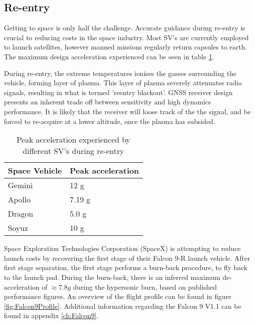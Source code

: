 \subsection{Re-entry}
Getting to space is only half the challenge. Accurate guidance during re-entry is crucial to reducing costs in the space industry. Most \ac{SV}'s are currently employed to launch satellites, however manned missions regularly return capsules to earth. The maximum design acceleration experienced can be seen in table \ref{ReEntryTable}. 

During re-entry, the extreme temperatures ionises the gasses surrounding the vehicle, forming  layer of plasma. This layer of plasma severely attenuates radio signals, resulting in what is termed 'reentry blackout'. GNSS receiver design presents an inherent trade off between sensitivity and high dynamics performance. It is likely that the receiver will loose track of the the signal, and be forced to re-acquire at a lower altitude, once the plasma has subsided. 


\begin{table}[!htb]
\centering
\begin{tabular}{|l|l|}
\hline
\rowcolor[HTML]{C0C0C0} 
Space Vehicle & Peak acceleration                    \\ \hline
Gemini        & 12 g \cite{FAA}                      \\ \hline
\rowcolor[HTML]{EFEFEF} 
Apollo        & 7.19 g \cite{johnston1975biomedical} \\ \hline
Dragon        & 5.0 g \cite{trevino2008spacex}       \\ \hline
\rowcolor[HTML]{EFEFEF} 
Soyuz         & 10 g \cite{ReentryDynamics}          \\ \hline
\end{tabular}
\caption{Peak acceleration experienced by different \ac{SV}'s during re-entry}
\label{ReEntryTable}
\end{table}

Space Exploration Technologies Corporation (SpaceX) is attempting to reduce launch costs by recovering the first stage of their Falcon 9-R launch vehicle. After first stage separation, the first stage performs a burn-back procedure, to fly back to the launch pad. During the burn-back, there is an inferred maximum de-acceleration of $\approx 7.8 g$ during the hypersonic burn, based on published performance figures. An overview of the flight profile can be found in figure \ref{fig:Falcon9Profile}. Additional information regarding the Falcon 9 V1.1 can be found in appendix \ref{ch:Falcon9}.

